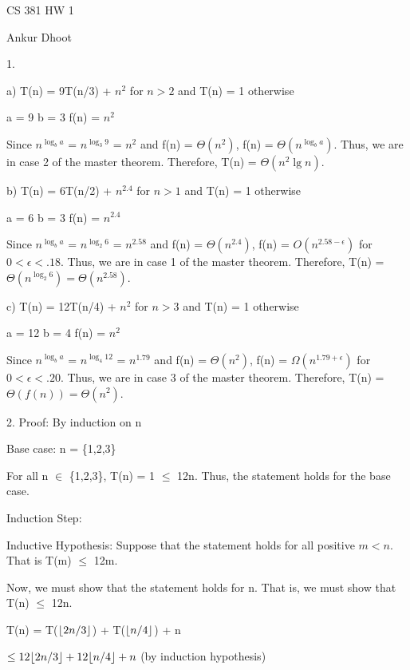 \documentclass[11pt,twoside,a4paper]{article}
\DeclarePairedDelimiter\floor{\lfloor}{\rfloor}
\begin{document}
\author{Ankur Dhoot}

CS 381 HW 1

Ankur Dhoot \newline

1. 

a) T(n) = 9T(n/3) + $n^{2}$ for $n > 2$ and T(n) = 1 otherwise

	a = 9 \qquad b = 3 \qquad	f(n) = $n^{2}$
	
Since $n^{\log_b a}$ = $n^{\log_3 9}$ = $n^{2}$ and f(n) = $\Theta(n^{2})$, f(n) = $\Theta(n^{\log_b a})$. Thus, we are in case 2 of the master theorem. Therefore, T(n) = $\Theta(n^{2} \lg n)$. \newline

b) T(n) = 6T(n/2) + $n^{2.4}$ for $n > 1$ and T(n) = 1 otherwise
 
 a = 6 \qquad b = 3 \qquad f(n) = $n^{2.4}$
 
 Since $n^{\log_b a}$ = $n^{\log_2 6}$ = $n^{2.58}$ and f(n) = $\Theta(n^{2.4})$, f(n) = $O(n^{2.58 - \epsilon})$ for $0 < \epsilon < .18$. Thus, we are in case 1 of the master theorem. Therefore, T(n) = $\Theta(n^{\log_2 6}) = \Theta(n^{2.58})$. \newline
 
c) T(n) = 12T(n/4) + $n^{2}$ for $n > 3$ and T(n) = 1 otherwise

a = 12 \qquad b = 4 \qquad f(n) = $n^{2}$

Since $n^{\log_b a}$ = $n^{\log_4 12}$ = $n^{1.79}$ and f(n) = $\Theta(n^{2})$, f(n) = $\Omega(n^{1.79 + \epsilon})$ for $0 < \epsilon < .20$. Thus, we are in case 3 of the master theorem. Therefore, T(n) = $\Theta(f(n)) = \Theta(n^{2})$. \newline

2. 
Proof: By induction on n

Base case: n = \{1,2,3\}

For all n $\in$ \{1,2,3\}, T(n) = 1 $\leq$ 12n.
Thus, the statement holds for the base case.

Induction Step:

\qquad Inductive Hypothesis: Suppose that the statement holds for all positive $m < n$. That is T(m) $\leq$ 12m. 

Now, we must show that the statement holds for n. That is, we must show that T(n) $\leq$ 12n.

T(n) = T($\floor*{2n/3}$) + T($\floor*{n/4}$) + n

$\leq 12\floor*{2n/3} + 12\floor*{n/4} + n$ (by induction hypothesis)
\end{document}
